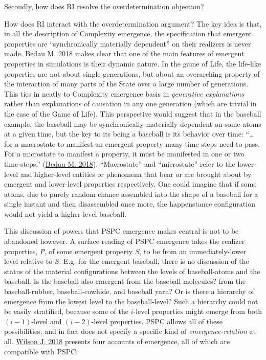 \documentclass{article}
\newcommand{\ti}[1]{\textit{#1}}
\renewcommand{\cite}[1]{\hyperlink{#1}{#1}}
\begin{document}

Secondly, how does RI resolve the overdetermination objection? 



How does RI interact with the overdetermination argument? The key idea is that, in all the description of Complexity emergence, the specification that emergent properties are ``synchronically materially dependent'' on their realizers is never made. \cite{Bedau M. 2018} makes clear that one of the main features of emergent properties in simulations is their dynamic nature. In the game of Life, the life-like properties are not about single generations, but about an overarching property of the interaction of many parts of the State over a large number of generations. This ties in neatly to Complexity emergence basis in \ti{generative explanations} rather than explanations of causation in any one generation (which are trivial in the case of the Game of Life). This perspective would suggest that in the baseball example, the baseball may be synchronically materially dependent on some atoms at a given time, but the key to its being a baseball is its behavior over time: ``\dots for a macrostate to manifest an emergent property many time steps need to pass. For a microstate to manifest a property, it must be manifested in one or two time-steps.'' (\cite{Bedau M. 2018}). ``Macrostate'' and ``microstate'' refer to the lower-level and higher-level entities or phenomena that bear or are brought about by emergent and lower-level properties respectively. One could imagine that if some atoms, due to purely random chance assembled into the shape of a baseball for a single instant and then disassembled once more, the happenstance configuration would not yield a higher-level baseball.

This discussion of powers that PSPC emergence makes central is not to be abandoned however. A surface reading of PSPC emergence takes the realizer properties, $P$, of some emergent property $S$, to be from an immediately-lower level relative to $S$. E.g. for the emergent baseball, there is no discussion of the status of the material configurations between the levels of baseball-atoms and the baseball. Is the baseball also emergent from the baseball-molecules? from the baseball-rubber, baseball-cowhide, and baseball yarn? Or is there a hierarchy of emergence from the lowest level to the baseball-level? Such a hierarchy could not be easily stratified, because some of the $i$-level properties might emerge from both $(i-1)$-level and $(i-2)$-level properties. PSPC allows all of these possibilities, and in fact does not specify a specific kind of \ti{emergence-relation} at all. \cite{Wilson J. 2018} presents four accounts of emergence, all of which are compatible with PSPC:
\end{document}
